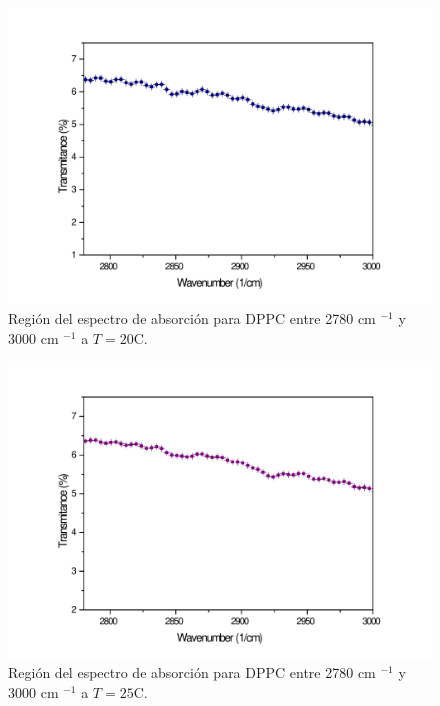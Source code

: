 \documentclass[%
 reprint,
 amsmath,amssymb,
 aps,
]{revtex4-2}
\begin{document}
\begin{figure}[ht]
\includegraphics[scale=0.25]{FTIR/20C.pdf}
  \caption{Regi\'{o}n del espectro de absorci\'{o}n para DPPC entre 2780 cm $^{-1}$ y 3000 cm $^{-1}$ a $T=20$\textdegree C.}
  \label{fig:espa20}
\end{figure}
\begin{figure}[ht]
\includegraphics[scale=0.25]{FTIR/25C.pdf}
  \caption{Regi\'{o}n del espectro de absorci\'{o}n para DPPC entre 2780 cm $^{-1}$ y 3000 cm $^{-1}$ a $T=25$\textdegree C.}
  \label{fig:espa25}
\end{figure}
\end{document}
